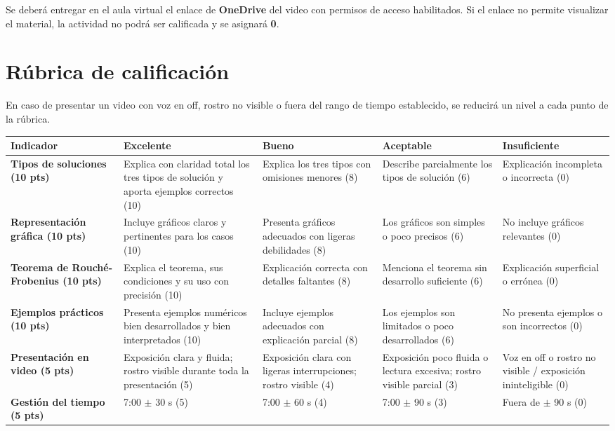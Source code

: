 \documentclass[a4,11pt]{aleph-notas}
\begin{document}
Se deberá entregar en el aula virtual el enlace de \textbf{OneDrive} del video con permisos de acceso habilitados. Si el enlace no permite visualizar el material, la actividad no podrá ser calificada y se asignará \textbf{0}.

\section{Rúbrica de calificación}

En caso de presentar un video con voz en off, rostro no visible o fuera del rango de tiempo establecido, se reducirá un nivel a cada punto de la rúbrica.

\begin{landscape}
\begin{center}\footnotesize
\begin{tabular}{p{5cm}p{4cm}p{4cm}p{4cm}p{4cm}}
\toprule
\textbf{Indicador} & \textbf{Excelente} & \textbf{Bueno} & \textbf{Aceptable} & \textbf{Insuficiente} \\ \midrule
\textbf{Tipos de soluciones (10 pts)} & Explica con claridad total los tres tipos de solución y aporta ejemplos correctos (10) & Explica los tres tipos con omisiones menores (8) & Describe parcialmente los tipos de solución (6) & Explicación incompleta o incorrecta (0) \\ \midrule
\textbf{Representación gráfica (10 pts)} & Incluye gráficos claros y pertinentes para los casos (10) & Presenta gráficos adecuados con ligeras debilidades (8) & Los gráficos son simples o poco precisos (6) & No incluye gráficos relevantes (0) \\ \midrule
\textbf{Teorema de Rouché-Frobenius (10 pts)} & Explica el teorema, sus condiciones y su uso con precisión (10) & Explicación correcta con detalles faltantes (8) & Menciona el teorema sin desarrollo suficiente (6) & Explicación superficial o errónea (0) \\ \midrule
\textbf{Ejemplos prácticos (10 pts)} & Presenta ejemplos numéricos bien desarrollados y bien interpretados (10) & Incluye ejemplos adecuados con explicación parcial (8) & Los ejemplos son limitados o poco desarrollados (6) & No presenta ejemplos o son incorrectos (0) \\ \midrule
\textbf{Presentación en video (5 pts)}
& Exposición clara y fluida; rostro visible durante toda la presentación (5)
& Exposición clara con ligeras interrupciones; rostro visible (4)
& Exposición poco fluida o lectura excesiva; rostro visible parcial (3)
& Voz en off o rostro no visible / exposición ininteligible (0) \\ \midrule
\textbf{Gestión del tiempo (5 pts)} & 7:00 $\pm$ 30 s (5) & 7:00 $\pm$ 60 s (4) & 7:00 $\pm$ 90 s (3) & Fuera de $\pm$ 90 s (0) \\ \bottomrule
\end{tabular}
\end{center}
\end{landscape}
\end{document}
